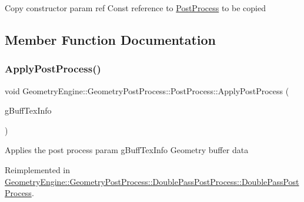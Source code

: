 Copy constructor param ref Const reference to \mbox{\hyperlink{class_geometry_engine_1_1_geometry_post_process_1_1_post_process}{Post\+Process}} to be copied 

\subsection{Member Function Documentation}
\mbox{\label{class_geometry_engine_1_1_geometry_post_process_1_1_post_process_a2dbb157265ebdeea658982673e757d46}} 
\subsubsection{\texorpdfstring{ApplyPostProcess()}{ApplyPostProcess()}}
{\footnotesize\ttfamily void Geometry\+Engine\+::\+Geometry\+Post\+Process\+::\+Post\+Process\+::\+Apply\+Post\+Process (\begin{DoxyParamCaption}\item[{const \mbox{\hyperlink{struct_geometry_engine_1_1_g_buffer_texture_info}{G\+Buffer\+Texture\+Info}} \&}]{g\+Buff\+Tex\+Info }\end{DoxyParamCaption})\hspace{0.3cm}{\ttfamily [virtual]}}

Applies the post process param g\+Buff\+Tex\+Info Geometry buffer data 

Reimplemented in \mbox{\hyperlink{class_geometry_engine_1_1_geometry_post_process_1_1_double_pass_post_process_1_1_double_pass_post_process_a9d2674bc5b237ed2e494d1c88f63d29e}{Geometry\+Engine\+::\+Geometry\+Post\+Process\+::\+Double\+Pass\+Post\+Process\+::\+Double\+Pass\+Post\+Process}}.

\mbox{\label{class_geometry_engine_1_1_geometry_post_process_1_1_post_process_a3657f263948ecee70314c859e15412e1}} 
